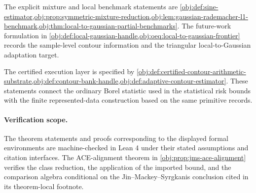 The explicit mixture and local benchmark statements are \cref{obj:def:sine-estimator,obj:prop:symmetric-mixture-reduction,obj:lem:gaussian-rademacher-l1-benchmark,obj:thm:local-to-gaussian-partial-benchmarks}. The future-work formulation in \cref{obj:def:local-gaussian-handle,obj:oeq:local-to-gaussian-frontier} records the sample-level contour information and the triangular local-to-Gaussian adaptation target.

The certified execution layer is specified by \cref{obj:def:certified-contour-arithmetic-substrate,obj:def:contour-bank-handle,obj:def:adaptive-contour-estimator}. These statements connect the ordinary Borel statistic used in the statistical risk bounds with the finite represented-data construction based on the same primitive records.

\paragraph{Verification scope.}
The theorem statements and proofs corresponding to the displayed formal environments are machine-checked in Lean 4 under their stated assumptions and citation interfaces. The ACE-alignment theorem in \cref{obj:prop:jms-ace-alignment} verifies the class reduction, the application of the imported bound, and the comparison algebra conditional on the Jin--Mackey--Syrgkanis conclusion cited in its theorem-local footnote.
